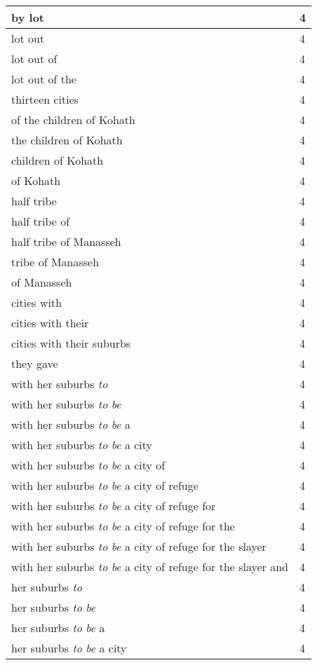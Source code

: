 \begin{center}
\begin{longtable}{|p{3.0in}|p{0.5in}|}
by lot & 4\\ \hline 
lot out & 4\\ \hline 
lot out of & 4\\ \hline 
lot out of the & 4\\ \hline 
thirteen cities & 4\\ \hline 
of the children of Kohath & 4\\ \hline 
the children of Kohath & 4\\ \hline 
children of Kohath & 4\\ \hline 
of Kohath & 4\\ \hline 
half tribe & 4\\ \hline 
half tribe of & 4\\ \hline 
half tribe of Manasseh & 4\\ \hline 
tribe of Manasseh & 4\\ \hline 
of Manasseh & 4\\ \hline 
cities with & 4\\ \hline 
cities with their & 4\\ \hline 
cities with their suburbs & 4\\ \hline 
they gave & 4\\ \hline 
with her suburbs \emph{to} & 4\\ \hline 
with her suburbs \emph{to} \emph{be} & 4\\ \hline 
with her suburbs \emph{to} \emph{be} a & 4\\ \hline 
with her suburbs \emph{to} \emph{be} a city & 4\\ \hline 
with her suburbs \emph{to} \emph{be} a city of & 4\\ \hline 
with her suburbs \emph{to} \emph{be} a city of refuge & 4\\ \hline 
with her suburbs \emph{to} \emph{be} a city of refuge for & 4\\ \hline 
with her suburbs \emph{to} \emph{be} a city of refuge for the & 4\\ \hline 
with her suburbs \emph{to} \emph{be} a city of refuge for the slayer & 4\\ \hline 
with her suburbs \emph{to} \emph{be} a city of refuge for the slayer and & 4\\ \hline 
her suburbs \emph{to} & 4\\ \hline 
her suburbs \emph{to} \emph{be} & 4\\ \hline 
her suburbs \emph{to} \emph{be} a & 4\\ \hline 
her suburbs \emph{to} \emph{be} a city & 4\\ \hline 

\end{longtable}
\end{center}

